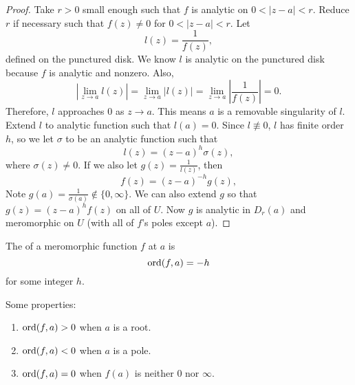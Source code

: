 \documentclass[notes]{subfile}
\begin{document}
\begin{proof}
    Take $r > 0$ small enough such that $f$ is analytic
    on $0 < |z-a| < r$.
    Reduce $r$ if necessary such that $f(z) \ne 0$ for
    $0 < |z-a| < r$.
    Let 
    \[ l(z) = \frac{1}{f(z)}, \]
    defined on the punctured disk.  
    We know $l$ is analytic on the punctured disk because
    $f$ is analytic and nonzero.
    Also,
    \[ \left| \lim_{z \to a} l(z) \right|
        = \lim_{z \to a} |l(z)|
        = \lim_{z \to a} \left| \frac{1}{f(z)}\right|
        = 0.
    \]
    Therefore, $l$ approaches $0$ as $z \to a$.
    This means $a$ is a removable singularity of $l$.
    Extend $l$ to analytic function such that $l(a) = 0$.
    Since $l \nequiv 0$, $l$ has finite order $h$, so we
    let $\sigma$ to be an analytic function such that
    \[ l(z) = (z-a)^h \sigma(z), \]
    where $\sigma(z) \ne 0$.
    If we also let $g(z) = \frac{1}{l(z)}$, then
    \[ f(z) = (z-a)^{-h} g(z), \]
    Note $g(a) = \frac{1}{\sigma(a)} \notin \{0, \infty \}$.
    We can also extend $g$ so that $g(z) = (z-a)^hf(z)$ 
    on all of $U$.
    Now $g$ is analytic in $D_r(a)$ and meromorphic on $U$
    (with all of $f$'s poles except $a$).
\end{proof}

\begin{definition}
    The  of a meromorphic function $f$ at 
    $a$ is 
    \[ \operatorname{ord}(f, a) = -h \]
    for some integer $h$.
\end{definition}

Some properties:
\begin{enumerate}
    \item $\operatorname{ord}(f, a) > 0$ when $a$ is a root.
    \item $\operatorname{ord}(f, a) < 0$ when $a$ is a pole.
    \item $\operatorname{ord}(f, a) = 0$ when $f(a)$ is neither $0$ nor
        $\infty$.
\end{enumerate}
\end{document}
